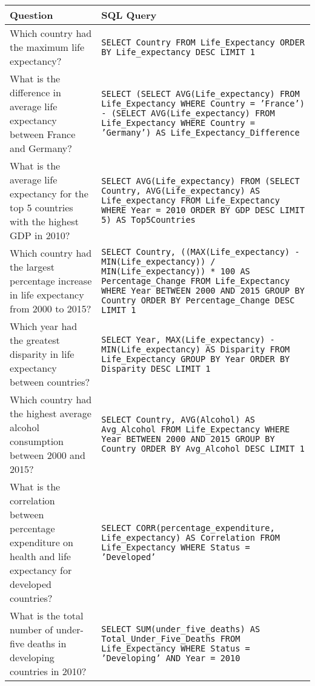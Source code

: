 \documentclass[11pt]{article}
\begin{document}
\begin{table*}[t]
\centering
\begin{tabular}{|p{}|p{}|}
\hline
\textbf{Question} & \textbf{SQL Query} \\
\hline
Which country had the maximum life expectancy? & \texttt{SELECT Country FROM Life\_Expectancy ORDER BY Life\_expectancy DESC LIMIT 1} \\ \hline
What is the difference in average life expectancy between France and Germany? & \texttt{SELECT (SELECT AVG(Life\_expectancy) FROM Life\_Expectancy WHERE Country = 'France') - (SELECT AVG(Life\_expectancy) FROM Life\_Expectancy WHERE Country = 'Germany') AS Life\_Expectancy\_Difference} \\ \hline
What is the average life expectancy for the top 5 countries with the highest GDP in 2010? & \texttt{SELECT AVG(Life\_expectancy) FROM (SELECT Country, AVG(Life\_expectancy) AS Life\_expectancy FROM Life\_Expectancy WHERE Year = 2010 ORDER BY GDP DESC LIMIT 5) AS Top5Countries} \\ \hline
Which country had the largest percentage increase in life expectancy from 2000 to 2015? & \texttt{SELECT Country, ((MAX(Life\_expectancy) - MIN(Life\_expectancy)) / MIN(Life\_expectancy)) * 100 AS Percentage\_Change FROM Life\_Expectancy WHERE Year BETWEEN 2000 AND 2015 GROUP BY Country ORDER BY Percentage\_Change DESC LIMIT 1} \\ \hline
Which year had the greatest disparity in life expectancy between countries? & \texttt{SELECT Year, MAX(Life\_expectancy) - MIN(Life\_expectancy) AS Disparity FROM Life\_Expectancy GROUP BY Year ORDER BY Disparity DESC LIMIT 1} \\ \hline
Which country had the highest average alcohol consumption between 2000 and 2015? & \texttt{SELECT Country, AVG(Alcohol) AS Avg\_Alcohol FROM Life\_Expectancy WHERE Year BETWEEN 2000 AND 2015 GROUP BY Country ORDER BY Avg\_Alcohol DESC LIMIT 1} \\ \hline
What is the correlation between percentage expenditure on health and life expectancy for developed countries? & \texttt{SELECT CORR(percentage\_expenditure, Life\_expectancy) AS Correlation FROM Life\_Expectancy WHERE Status = 'Developed'} \\ \hline
What is the total number of under-five deaths in developing countries in 2010? & \texttt{SELECT SUM(under\_five\_deaths) AS Total\_Under\_Five\_Deaths FROM Life\_Expectancy WHERE Status = 'Developing' AND Year = 2010} \\ \hline

\end{tabular}
\end{table*}
\end{document}
